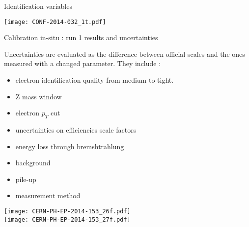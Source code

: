 \begin{frame}{Identification variables}
  \begin{center}
\texttt{[image: CONF-2014-032\_1t.pdf]}
\end{center}
\end{frame}

\begin{frame}{Calibration in-situ : run 1  results and uncertainties}
\begin{minipage}{0.64\linewidth}
  Uncertainties are evaluated as the difference between official scales and the ones measured with a changed parameter. 
  They include :
  \begin{itemize}
  \item electron identification quality from medium to tight.
  \item Z mass window 
  \item electron $p_T$ cut
  \item uncertainties on efficiencies scale factors
  \item energy loss through bremshtrahlung
  \item background
  \item pile-up
  \item measurement method
  \end{itemize}
\end{minipage}
\begin{minipage}{0.35\linewidth}
    \texttt{[image: CERN-PH-EP-2014-153\_26f.pdf]}\\
    \texttt{[image: CERN-PH-EP-2014-153\_27f.pdf]}
\end{minipage}
\end{frame}
